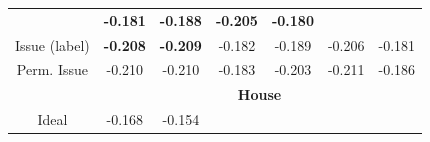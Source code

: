 \begin{table}
\begin{tabular}{|c|cccccc|}
    & \hspace{-4pt} \textbf{-0.181} \hspace{-5pt}
    & \hspace{-4pt} \textbf{-0.188} \hspace{-5pt}
    & \hspace{-4pt} \textbf{-0.205} \hspace{-5pt}
    & \hspace{-4pt} \textbf{-0.180} \hspace{-4pt} \\
    Issue (label)
    & \hspace{-4pt} \textbf{-0.208} \hspace{-5pt}
    & \hspace{-4pt} \textbf{-0.209} \hspace{-5pt}
    & \hspace{-4pt} -0.182 \hspace{-5pt}
    & \hspace{-4pt} -0.189 \hspace{-5pt}
    & \hspace{-4pt} -0.206 \hspace{-5pt}
   & \hspace{-4pt} -0.181 \hspace{-4pt} \\
    \hspace{-5pt} Perm. Issue \hspace{-5pt}
    & \hspace{-4pt} -0.210 \hspace{-5pt}
    & \hspace{-4pt} -0.210 \hspace{-5pt}
    & \hspace{-4pt} -0.183 \hspace{-5pt}
    & \hspace{-4pt} -0.203 \hspace{-5pt}
    & \hspace{-4pt} -0.211 \hspace{-5pt}
    & \hspace{-4pt} -0.186 \hspace{-4pt} \\
    \hline
    \hline
    & \multicolumn{6}{|c|}{\textbf{House}} \\
    \hline
    Ideal & \hspace{-4pt} -0.168 \hspace{-5pt}
    & \hspace{-4pt} -0.154 \hspace{-5pt}

\end{tabular}
\end{table}
